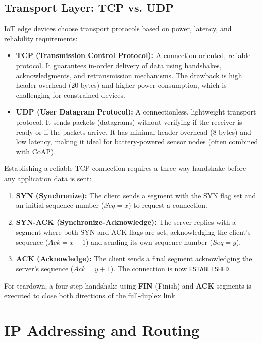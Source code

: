 \documentclass[12pt,a4paper]{article}
\begin{document}
\subsection{Transport Layer: TCP vs. UDP}
IoT edge devices choose transport protocols based on power, latency, and reliability requirements:
\begin{itemize}[leftmargin=*, itemsep=3pt]
  \item \textbf{TCP (Transmission Control Protocol):} A connection-oriented, reliable protocol. It guarantees in-order delivery of data using handshakes, acknowledgments, and retransmission mechanisms. The drawback is high header overhead (20 bytes) and higher power consumption, which is challenging for constrained devices.
  \item \textbf{UDP (User Datagram Protocol):} A connectionless, lightweight transport protocol. It sends packets (datagrams) without verifying if the receiver is ready or if the packets arrive. It has minimal header overhead (8 bytes) and low latency, making it ideal for battery-powered sensor nodes (often combined with CoAP).
\end{itemize}

\begin{tcolorbox}[examplebox, title={TCP Three-Way Handshake Connection Lifecycle}]
  Establishing a reliable TCP connection requires a three-way handshake before any application data is sent:
  \begin{enumerate}[leftmargin=*, itemsep=2pt]
    \item \textbf{SYN (Synchronize):} The client sends a segment with the SYN flag set and an initial sequence number ($Seq = x$) to request a connection.
    \item \textbf{SYN-ACK (Synchronize-Acknowledge):} The server replies with a segment where both SYN and ACK flags are set, acknowledging the client's sequence ($Ack = x+1$) and sending its own sequence number ($Seq = y$).
    \item \textbf{ACK (Acknowledge):} The client sends a final segment acknowledging the server's sequence ($Ack = y+1$). The connection is now \texttt{ESTABLISHED}.
  \end{enumerate}
  For teardown, a four-step handshake using \textbf{FIN} (Finish) and \textbf{ACK} segments is executed to close both directions of the full-duplex link.
\end{tcolorbox}

\section{IP Addressing and Routing}
\end{document}
